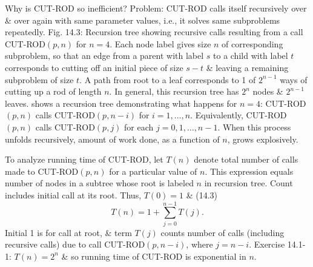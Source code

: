 \documentclass{article}
\begin{document}
\begin{itemize}
\begin{itemize}
\begin{itemize}
\begin{itemize}
				Why is CUT-ROD so inefficient? Problem: CUT-ROD calls itself recursively over \& over again with same parameter values, i.e., it solves same subproblems repeatedly. {\sf Fig. 14.3: Recursion tree showing recursive calls resulting from a call CUT-ROD$(p,n)$ for $n = 4$. Each node label gives size $n$ of corresponding subproblem, so that an edge from a parent with label $s$ to a child with label $t$ corresponds to cutting off an initial piece of size $s - t$ \& leaving a remaining subproblem of size $t$. A path from root to a leaf corresponds to 1 of $2^{n-1}$ ways of cutting up a rod of length $n$. In general, this recursion tree has $2^n$ nodes \& $2^{n-1}$ leaves.} shows a recursion tree demonstrating what happens for $n = 4$: CUT-ROD$(p,n)$ calls CUT-ROD$(p,n - i)$ for $i = 1,\ldots,n$. Equivalently, CUT-ROD$(p,n)$ calls CUT-ROD$(p,j)$ for each $j = 0,1,\ldots,n - 1$. When this process unfolds recursively, amount of work done, as a function of $n$, grows explosively.
				
				To analyze running time of CUT-ROD, let $T(n)$ denote total number of calls made to CUT-ROD$(p,n)$ for a particular value of $n$. This expression equals number of nodes in a subtree whose root is labeled $n$ in recursion tree. Count includes initial call at its root. Thus, $T(0) = 1$ \& (14.3)
				\begin{equation*}
					T(n) = 1 + \sum_{j=0}^{n-1} T(j).
				\end{equation*}
				Initial 1 is for call at root, \& term $T(j)$ counts number of calls (including recursive calls) due to call CUT-ROD$(p,n - i)$, where $j = n - i$. Exercise 14.1-1: $T(n) = 2^n$ \& so running time of CUT-ROD is exponential in $n$.
				

\end{itemize}
\end{itemize}
\end{itemize}
\end{itemize}
\end{document}

